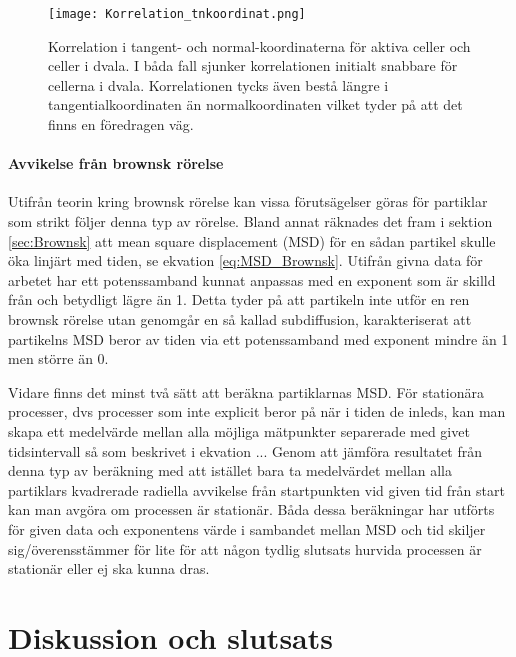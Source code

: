 \begin{figure}
    \centering
    \texttt{[image: Korrelation\_tnkoordinat.png]}
    \caption{Korrelation i tangent- och normal-koordinaterna för aktiva celler och celler i dvala. I båda fall sjunker korrelationen initialt snabbare för cellerna i dvala. Korrelationen tycks även bestå längre i tangentialkoordinaten än normalkoordinaten vilket tyder på att det finns en föredragen väg.}
    \label{fig:Korr_tn}
\end{figure}

\paragraph{Avvikelse från brownsk rörelse}
Utifrån teorin kring brownsk rörelse kan vissa förutsägelser göras för partiklar som strikt följer denna typ av rörelse. Bland annat räknades det fram i sektion \ref{sec:Brownsk} att mean square displacement (MSD) för en sådan partikel skulle öka linjärt med tiden, se ekvation \eqref{eq:MSD_Brownsk}. Utifrån givna data för arbetet har ett potenssamband kunnat anpassas med en exponent som är skilld från och betydligt lägre än 1. Detta tyder på att partikeln inte utför en ren brownsk rörelse utan genomgår en så kallad subdiffusion, karakteriserat att partikelns MSD beror av tiden via ett potenssamband med exponent mindre än 1 men större än 0.

Vidare finns det minst två sätt att beräkna partiklarnas MSD. För stationära processer, dvs processer som inte explicit beror på när i tiden de inleds, kan man skapa ett medelvärde mellan alla möjliga mätpunkter separerade med givet tidsintervall så som beskrivet i ekvation ...
Genom att jämföra resultatet från denna typ av beräkning med att istället bara ta medelvärdet mellan alla partiklars kvadrerade radiella avvikelse från startpunkten vid given tid från start kan man avgöra om processen är stationär.
Båda dessa beräkningar har utförts för given data och exponentens värde i sambandet mellan MSD och tid skiljer sig/överensstämmer för lite för att någon tydlig slutsats hurvida processen är stationär eller ej ska kunna dras. 


\section{Diskussion och slutsats}







